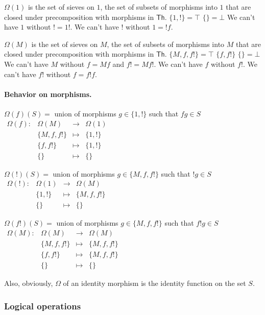 $\Omega(1)$ is the set of sieves on $1$, the set of subsets of morphisms into $1$ that are closed under precomposition with morphisms in $\mathsf{Th}$.
$\{1, !\}= \top$
$\{\} = \bot$
We can't have $1$ without $! = 1!$.  We can't have $!$ without $1 = !f$.

$\Omega(M)$ is the set of sieves on $M$, the set of subsets of morphisms into $M$ that are closed under precomposition with morphisms in $\mathsf{Th}$.
$\{M, f, f!\} = \top$
$\{f, f!\}$
$\{\} = \bot$
We can't have $M$ without $f=Mf$ and $f!=Mf!$.  We can't have $f$ without $f!$.  We can't have $f!$ without $f = f!f$.

\paragraph{Behavior on morphisms.}

$\Omega(f)(S) =$ union of morphisms $g\in\{1, !\}$ such that $fg \in S$
$\begin{array}{rrcl}\Omega(f)\colon & \Omega(M) & \to & \Omega(1) \\ &\{M, f, f!\} & \mapsto & \{1, !\} \\ & \{f, f!\} & \mapsto & \{1, !\} \\ & \{\} & \mapsto & \{\}\end{array}$

$\Omega(!)(S) =$ union of morphisms $g\in\{M, f, f!\}$ such that $!g \in S$
$\begin{array}{rrcl}\Omega(!)\colon & \Omega(1) & \to & \Omega(M) \\ & \{1, !\} & \mapsto & \{M, f, f!\} \\ & \{\} & \mapsto & \{\}\end{array}$

$\Omega(f!)(S) =$ union of morphisms $g\in\{M, f, f!\}$ such that $f!g \in S$
$\begin{array}{rrcl}\Omega(M)\colon & \Omega(M) & \to & \Omega(M) \\ & \{M, f, f!\} & \mapsto & \{M, f, f!\} \\ & \{f, f!\} & \mapsto & \{M, f, f!\} \\ & \{\} & \mapsto & \{\}\end{array}$

Also, obviously, $\Omega$ of an identity morphism is the identity function on the set $S$.

\subsubsection{Logical operations}

